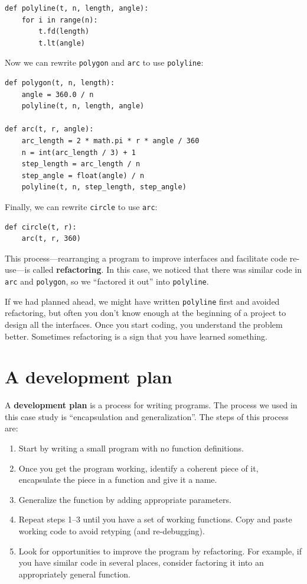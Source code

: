 \documentclass[10pt]{book}
\begin{document}
\begin{verbatim}
def polyline(t, n, length, angle):
    for i in range(n):
        t.fd(length)
        t.lt(angle)
\end{verbatim}
%
Now we can rewrite {\tt polygon} and {\tt arc} to use {\tt polyline}:

\begin{verbatim}
def polygon(t, n, length):
    angle = 360.0 / n
    polyline(t, n, length, angle)

def arc(t, r, angle):
    arc_length = 2 * math.pi * r * angle / 360
    n = int(arc_length / 3) + 1
    step_length = arc_length / n
    step_angle = float(angle) / n
    polyline(t, n, step_length, step_angle)
\end{verbatim}
%
Finally, we can rewrite {\tt circle} to use {\tt arc}:

\begin{verbatim}
def circle(t, r):
    arc(t, r, 360)
\end{verbatim}
%
This process---rearranging a program to improve
interfaces and facilitate code re-use---is called {\bf refactoring}.
In this case, we noticed that there was similar code in {\tt arc} and
{\tt polygon}, so we ``factored it out'' into {\tt polyline}.

If we had planned ahead, we might have written {\tt polyline} first
and avoided refactoring, but often you don't know enough at the
beginning of a project to design all the interfaces.  Once you start
coding, you understand the problem better.  Sometimes refactoring is a
sign that you have learned something.


\section{A development plan}

A {\bf development plan} is a process for writing programs.  The
process we used in this case study is ``encapsulation and
generalization''.  The steps of this process are:

\begin{enumerate}

\item Start by writing a small program with no function definitions.

\item Once you get the program working, identify a coherent piece of
  it, encapsulate the piece in a function and give it a name.

\item Generalize the function by adding appropriate parameters.

\item Repeat steps 1--3 until you have a set of working functions.
Copy and paste working code to avoid retyping (and re-debugging).

\item Look for opportunities to improve the program by refactoring.
For example, if you have similar code in several places, consider
factoring it into an appropriately general function.

\end{enumerate}
\end{document}
